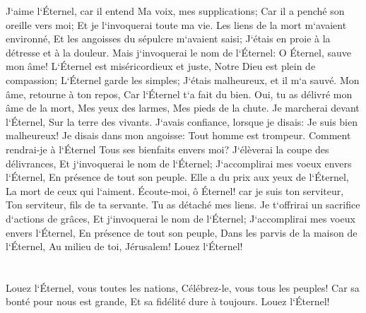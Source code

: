 \verse J`aime l`Éternel, car il entend Ma voix, mes supplications; 
\verse Car il a penché son oreille vers moi; Et je l`invoquerai toute ma vie. 
\verse Les liens de la mort m`avaient environné, Et les angoisses du sépulcre m`avaient saisi; J`étais en proie à la détresse et à la douleur. 
\verse Mais j`invoquerai le nom de l`Éternel: O Éternel, sauve mon âme! 
\verse L`Éternel est miséricordieux et juste, Notre Dieu est plein de compassion; 
\verse L`Éternel garde les simples; J`étais malheureux, et il m`a sauvé. 
\verse Mon âme, retourne à ton repos, Car l`Éternel t`a fait du bien. 
\verse Oui, tu as délivré mon âme de la mort, Mes yeux des larmes, Mes pieds de la chute. 
\verse Je marcherai devant l`Éternel, Sur la terre des vivants. 
\verse J`avais confiance, lorsque je disais: Je suis bien malheureux! 
\verse Je disais dans mon angoisse: Tout homme est trompeur. 
\verse Comment rendrai-je à l`Éternel Tous ses bienfaits envers moi? 
\verse J`élèverai la coupe des délivrances, Et j`invoquerai le nom de l`Éternel; 
\verse J`accomplirai mes voeux envers l`Éternel, En présence de tout son peuple. 
\verse Elle a du prix aux yeux de l`Éternel, La mort de ceux qui l`aiment. 
\verse Écoute-moi, ô Éternel! car je suis ton serviteur, Ton serviteur, fils de ta servante. Tu as détaché mes liens. 
\verse Je t`offrirai un sacrifice d`actions de grâces, Et j`invoquerai le nom de l`Éternel; 
\verse J`accomplirai mes voeux envers l`Éternel, En présence de tout son peuple, 
\verse Dans les parvis de la maison de l`Éternel, Au milieu de toi, Jérusalem! Louez l`Éternel! 

\chapter{}

\verse Louez l`Éternel, vous toutes les nations, Célébrez-le, vous tous les peuples! 
\verse Car sa bonté pour nous est grande, Et sa fidélité dure à toujours. Louez l`Éternel! 

\chapter{}

